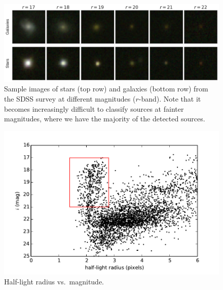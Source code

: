 \begin{figure}
  \centering
  \includegraphics[width=\textwidth]{figures/sgstamps.pdf}
  \caption{Sample images of stars (top row) and galaxies (bottom row) from the SDSS survey
  at different magnitudes ($r$-band).
  Note that it becomes increasingly difficult to classify sources at fainter magnitudes,
  where we have the majority of the detected sources.}
  \label{fig:sg_mag}
\end{figure}

\begin{figure}[htp]
  \centering
  \includegraphics{figures/morph.pdf}
  \caption{Half-light radius vs.\ magnitude.}
  \label{fig:intro_morc}
\end{figure}

